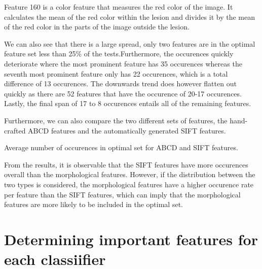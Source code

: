 \documentclass{kththesis}
\begin{document}
Feature 160 is a color feature that measures the red color of the image. It calculates the mean of the red color within the lesion and divides it by the mean of the red color in the parts of the image outside the lesion.

We can also see that there is a large spread, only two features are in the optimal feature set less than 25\% of the tests.Furthermore, the occurences quickly deteriorate where the most prominent feature has 35 occurences whereas the seventh most prominent feature only has 22 occurences, which is a total difference of 13 occurences. The downwards trend does however flatten out quickly as there are 52 features that have the occurence of 20-17 occurences. Lastly, the final span of 17 to 8 occurences entails all of the remaining features. 


Furthermore, we can also compare the two different sets of features, the hand-crafted ABCD features and the automatically generated SIFT features.

\begin{table}[h!]
  \caption{Average number of occurences in optimal set for ABCD and SIFT features.}
\end{table}

From the results, it is observable that the SIFT features have more occurences overall than the morphological features. However, if the distribution between the two types is considered, the morphological features have a higher occurence rate per feature than the SIFT features, which can imply that the morphological features are more likely to be included in the optimal set.

\section{Determining important features for each classiifier}
\end{document}
